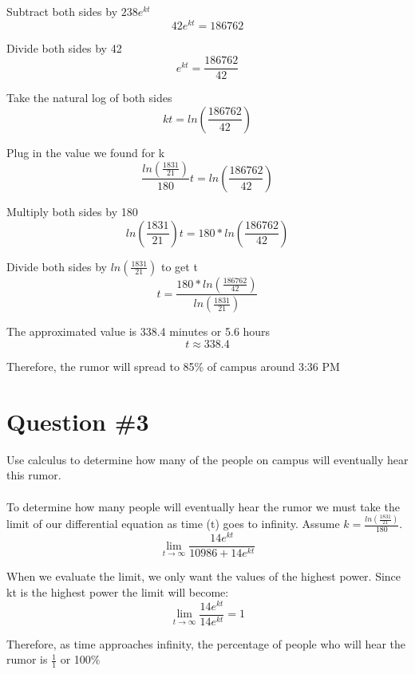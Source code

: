 \documentclass[12pt]{article}
\begin{document}
Subtract both sides by $238e^{kt}$
\begin{equation*}
42e^{kt} = 186762
\end{equation*}

Divide both sides by 42
\begin{equation*}
e^{kt} = \frac{186762}{42}
\end{equation*}

Take the natural log of both sides
\begin{equation*}
kt = ln(\frac{186762}{42})
\end{equation*}

Plug in the value we found for k
\begin{equation*}
\frac{ln(\frac{1831}{21})}{180}t = ln(\frac{186762}{42})
\end{equation*}

Multiply both sides by 180
\begin{equation*}
ln(\frac{1831}{21})t = 180*ln(\frac{186762}{42})
\end{equation*}

Divide both sides by $ln(\frac{1831}{21})$ to get t
\begin{equation*}
t = \frac{180*ln(\frac{186762}{42})}{ln(\frac{1831}{21})}
\end{equation*}

The approximated value is 338.4 minutes or 5.6 hours
\begin{equation*}
t \approx 338.4
\end{equation*}

Therefore, the rumor will spread to 85\% of campus around 3:36 PM 

\section{Question \#3}
Use calculus to determine how many of the people on campus will eventually hear this rumor.
\\ \\
To determine how many people will eventually hear the rumor we must take the limit of our differential equation as time (t) goes to infinity. Assume $k = \frac{ln(\frac{1831}{21})}{180}$.
\begin{equation*}
\lim_{t\to\infty} \frac{14e^{kt}}{10986+14e^{kt}} 
\end{equation*}

When we evaluate the limit, we only want the values of the highest power. Since kt is the highest power the limit will become:
\begin{equation*}
\lim_{t\to\infty} \frac{14e^{kt}}{14e^{kt}} = 1
\end{equation*}

Therefore, as time approaches infinity, the percentage of people who will hear the rumor is $\frac{1}{1}$ or 100\%
\end{document}
